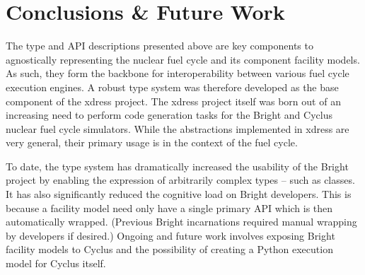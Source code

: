 \documentclass{ansconfpaper}
\begin{document}
\section{Conclusions \& Future Work}
\label{sec:conc}

The type and API descriptions presented above are key components to agnostically
representing the nuclear fuel cycle and its component facility models.  As such,
they form the backbone for interoperability between various fuel cycle execution 
engines.  A robust type system was therefore developed as the base component of 
the xdress project.  The xdress project itself was born out of an increasing need 
to perform code generation tasks for the Bright and Cyclus nuclear fuel cycle 
simulators.  While the abstractions implemented in xdress are very general, their 
primary usage is in the context of the fuel cycle.  

To date, the type system has dramatically increased the usability of the Bright
project by enabling the expression of arbitrarily complex types -- such as classes.
It has also significantly reduced the cognitive load on Bright developers.  This 
is because a facility model need only have a single primary API which is then 
automatically wrapped. (Previous Bright incarnations required manual wrapping by
developers if desired.)  Ongoing and future work involves exposing Bright facility
models to Cyclus and the possibility of creating a Python 
execution model for Cyclus itself.

\setlength{\baselineskip}{12pt}



\end{document}
